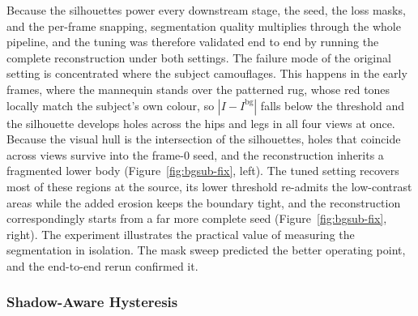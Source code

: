 Because the silhouettes power every downstream stage, the seed, the loss masks, and
the per-frame snapping, segmentation quality multiplies through the whole pipeline,
and the tuning was therefore validated end to end by running the complete
reconstruction under both settings. The failure mode of the original setting is
concentrated where the subject camouflages. This happens in the early frames, where the mannequin stands
over the patterned rug, whose red tones locally match the subject's own colour,
so $|I - I^{\mathrm{bg}}|$ falls below the threshold and the silhouette develops
holes across the hips and legs in all four views at once. Because the visual hull is
the intersection of the silhouettes, holes that coincide across views survive
into the frame-0 seed, and the reconstruction inherits a fragmented lower body
(Figure~\ref{fig:bgsub-fix}, left). The tuned setting recovers most of these regions
at the source, its lower threshold re-admits the low-contrast areas while the added
erosion keeps the boundary tight, and the reconstruction correspondingly starts from
a far more complete seed (Figure~\ref{fig:bgsub-fix}, right). The experiment illustrates the practical value of
measuring the segmentation in isolation. The mask sweep predicted the better
operating point, and the end-to-end rerun confirmed it.

\subsubsection{Shadow-Aware Hysteresis}
\label{sec:results-hysteresis}

